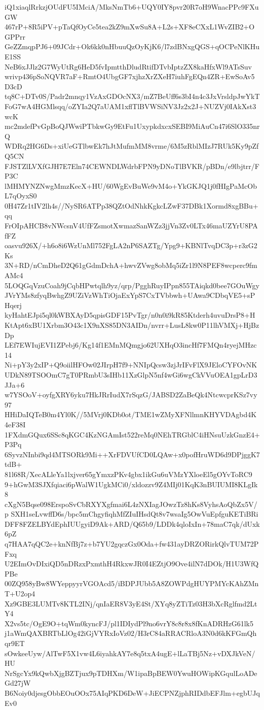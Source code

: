 iQ1xiaqlRrkzjOUdFU5IMciA/MksNmTb6+UQY0IY8pvr20R7oH9WnacPPc9FXuGW
467rP+8R5iPV+pTaQfOyCe5tea2kZ9mXwSu8A+L2s+XF8eCXxL1WvZIB2+OGPPrr
GeZZmqpPJ6+09JCdr+Ok6kk0nHbuuQzOyKjK6/l7zdBNxgQGS+qOCPeNlKHuE1SS
NeB6xJJlz2G7WyUtRg6HeD5fvIpmtthDludRtifDTvbIptzZX8kaHfxWl9ATsSuv
wrivp436pSoNQVR7aF+RmtO4UbgGF7xjhzXrZXeH7iuhFgEQn4ZR+EwSoAv5D3cD
tq8C+DTv0S/Padr2mnqy1VzAxGDOcNX3/mZ7BeUff6s3bI4n4c3JxVrsldpJwYkT
FoG7wA4HGMlsqq/oZYIa2Q7aUAM1xflTlBVWSiNV3Jz2x2J+NUZVj0IAkXst3wcK
mc2mdefPvGpBoQJWwiPTbkwGy9EtFu1UxypkdxcxSEBI9MiAuCn47i6SlO335nrQ
WDRq2HG6Ds+xiUeGTlbwEk7hJtMufmMM8vrme/6M5zRblMIzJ7RUk5Ky9pZfQ5CN
FJSTZlLVXfGJH7E7Eln74CEWNDLWdrbFPN9yDNoTlBVKR/pBDn/e9lbjtrr/FP3C
lMHMYNZNwgMmzKecX+HU/60WgEvBuWe9vM4o+YkGKJQ1j0fHIgPaMcObL7qOyxS0
0H47Zr1tIV2lh4s//NySR6ATPp38QZtOdNhkKgkcLZwF37DBk1Xormd8xgBBu+qq
FrOIpAHCB8vNWcsnV4UfFZsmotXwmazSanWZz3jjVn3Zv0LTx46maUZYrU8PAfFZ
oasvu926X/+h6o8i6WzUnMl752FgLA2nP6SAZTg/Ypg9+KBNlTvqDC3p+r3zG2Ks
3N+RD/nCmDheD2Q61gGdmDchA+hwvZVwg8obMq5iZr1l9N8PEF8wcperc9fmAMc4
5LOQGqVzuCoah9jCqbHPwtqlh9yz/qrp/PgghRuyIPpn855TAiqkd0bee7GOuWgy
JVrYMs8zfyqBwhgZ9UZiVzWhTiOjaExYpS7CxTVbbwh+UAwa9CDbqVE5+sPHqerj
kyHahtEJpi5ql0kWBXAyD5qpisGDF15PvTgr/n0n0i9kR85Ktderh4uvuDrsP8+H
KtApt6xBU1Xrbm3O43c1X9nXS85DN3AIDn/nvrr+LusL8kw0P11lhVMXj+HjBzDp
LEf7EWIujEVI1ZPebj6/Kg14f1EMnMQmgjo62UXHqO3incHf7FMQn4ryejMHzc14
Ni+pY3y2xIP+Q9oiilHFOw02JIrpH7f9+NNIpQcsw3zjJrIFvFlX9JEloCYFOvNK
UDkN89TSOOmC7gT0PRmbU3sIHb11XzGlpN5nf4wGi6wgCkVVuOEA1gpLrD3JJa+6
w7YSOoV+oyfgXRY6yku7HkJRrIudX7rSqzG/JABSD2ZaBeQk4NtcwcprKSz7vy97
HHiDaIQTeB0m4Yl0K//5MVrj0KDb0ot/TME1wZMyXFNllmnKHYVDAgbd4K4eF38I
1FXdmGQux6SSc8qKGC4KzNGAmIst522reMq0NEhTRGblC4iHNsuUzkGnzE4+P3Pq
6SyvzNInbi9qd4MTSORk9Mi++XrFDVUfCD0LQAw+x0pofHruWD6d9DPjggK7tdB+
81l68R/XecALleYa1lxjver65gYmxzPKv4gbx1ikGu6uVMzYXloeEl5gOYvToRC9
9+hGwM3SJXfqiaci6pWalW1UgkMCi0/xldozzv9Z4MIj01KqK3nBUIUMI8KLgIk8
cXgN5Bqse098ErspoSvCbRXYXgfmai6L4zNXIagJOwzTz8hKs8VyhsAoQbZx5V/p
SXH1seLvwffD6s/bpc5mChgyfiqhMfZIuIHsdQt8v7wsaIg5OwVuEpfguKETiBRi
DFF8FZELBYdEphIUUgyiD9Ak+ARD/Q65b9/LDDk4qloIxIn+78maC7qk/dUxk6pZ
q7HAA7qQC2e+knNfBj7z+b7YU2gqczGx0Oda+fw431ayDRZORirkQlvTUM72PFxq
U2EImOvDIxiQD5nDRzxPxmthH4RkxwJR0I4EZtjO9Ove4ilN7dDOk/H1U3WfQPBe
00ZQ958yBw8WYeppyyrVGOAcd5/iBDPJUbb5A8ZOWPdgHUYPMYcKAhZMnT+U2op4
Xz9GBE3LUMTv8KTL2INj/qnIaER8V3yE4St/XYq8yZTiTz03H3bXcRglfmd2LtY4
X2vs5tc/OgE9O+tqWm0kyncFJ/pl1IDIydPl9no6vrY8c8r8x8fKnADRHzG61lk5
j1aWmQAXBRTbLlOg42iGjVYRxIoVz02/H3rC84aRRACRloA3N0d6kKFGmQhqr9ET
sOwkeeUyw/AlTwF5X1vw4L6iyahkAY7e8q5txA4ugE+lLaTBj5Nz+vDXJkVeN/HU
NrSgcYx9kQwbXjgBZTjux9pTDHXm/W1ipaBpBEW0YwuHOWipKGqulLoADeGd27jW
B6Noiy0djesgObbEOuOOx75AIqPKD6DeW+JiECPNZjphRIDdbEFJlm+egbUJqEv0
